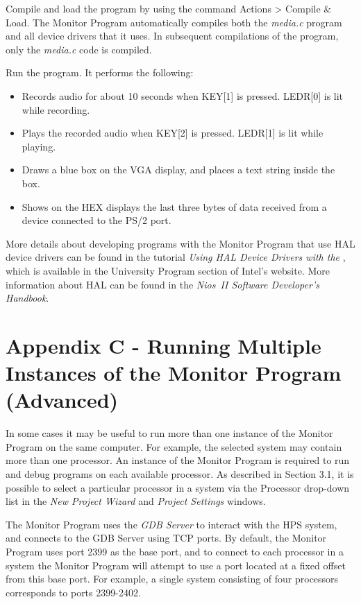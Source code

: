 \documentclass[11pt, twoside, pdftex]{article}
\begin{document}
Compile and load the program by using the command 
{\sf Actions > Compile \& Load}. 
The Monitor Program automatically compiles both the {\it media.c}
program and all device drivers that it uses. In subsequent
compilations of the program, only the {\it media.c} code is
compiled. 

Run the program. It performs the following: 
\begin{itemize}
\item
Records audio for about 10 seconds when KEY[1] is pressed. 
LEDR[0] is lit while recording.
\item 
Plays the recorded audio when KEY[2] is pressed. LEDR[1] is lit while playing.
\item
Draws a blue box on the VGA display, and places a text string inside the box.
\item
Shows on the HEX displays the last three bytes of data received from a device connected to the PS/2 port. 
\end{itemize}

More details about developing programs with the Monitor Program
that use HAL device drivers can be found in the tutorial 
{\it Using HAL Device Drivers with the \productNameMed{}}, which is available in the University Program section of Intel's
website. More information about HAL can be found in the
{\it Nios~II Software Developer's Handbook}.


\newpage
\section{Appendix C - Running Multiple Instances of the Monitor Program (Advanced)}

In some cases it may be useful to run more than one instance of
the Monitor Program on the same computer. For example, the
selected system may contain more than one processor. 
An instance of the Monitor Program is required to run and debug
programs on each available processor. As described in 
Section 3.1, it is possible to select a particular processor
in a system via the \textsf{Processor} drop-down
list in the {\it New Project Wizard} and {\it Project Settings}
windows.

The Monitor Program uses the {\it GDB Server} to interact with
the HPS system, and connects to the GDB Server using TCP ports.
By default, the Monitor Program uses port 2399 as the base port,
and to connect to each processor in a system the Monitor Program
will attempt to use a port located at a fixed offset from this
base port. For example, a single system consisting of four
processors corresponds to ports 2399-2402.
\end{document}
